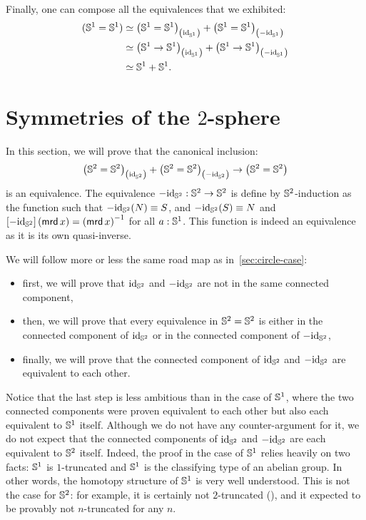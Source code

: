 \documentclass[english,a4]{article}
\renewcommand{\ap}[1]{\left[{#1}\right]}
\begin{document}
Finally, one can compose all the equivalences that we exhibited:
\begin{align*}
  ({{\mathbb S^{1}}}={{\mathbb S^{1}}})
  & \simeq {\left({{\mathbb S^{1}}}= {{\mathbb S^{1}}}\right)}_{\left(\mathord{\mathrm{id}}_{{\mathbb S^{1}}}\right)}
    + {\left({{\mathbb S^{1}}} = {{\mathbb S^{1}}}\right)}_{\left(-\mathord{\mathrm{id}}_{{\mathbb S^{1}}}\right)}
  \\
  & \simeq {\left({{\mathbb S^{1}}}\to {{\mathbb S^{1}}}\right)}_{\left(\mathord{\mathrm{id}}_{{\mathbb S^{1}}}\right)}
    + {\left({{\mathbb S^{1}}} \to {{\mathbb S^{1}}}\right)}_{\left(-\mathord{\mathrm{id}}_{{\mathbb S^{1}}}\right)}
  \\
  & \simeq {{\mathbb S^{1}}} + {{\mathbb S^{1}}}.
\end{align*}

\section{Symmetries of the $2$-sphere}
\label{sec:sphere}

In this section, we will prove that the canonical inclusion:
\begin{equation}
  \label{eq:goal-section-sphere}
  {\left({{\mathbb S^{2}}}= {{\mathbb S^{2}}}\right)}_{\left(\mathord{\mathrm{id}}_{{\mathbb S^{2}}}\right)} +
  {\left({{\mathbb S^{2}}} = {{\mathbb S^{2}}}\right)}_{\left(-\mathord{\mathrm{id}}_{{\mathbb S^{2}}}\right)}
  \to 
  \left({{\mathbb S^{2}}} = {{\mathbb S^{2}}}\right)
\end{equation}
is an equivalence. The equivalence $-\mathord{\mathrm{id}}_{{\mathbb S^{2}}} : {{\mathbb S^{2}}} \to {{\mathbb S^{2}}}$ is
define by ${{\mathbb S^{2}}}$-induction as the function such that
$-\mathord{\mathrm{id}}_{{\mathbb S^{2}}}(N) \equiv S$, and $-\mathord{\mathrm{id}}_{{\mathbb S^{2}}}(S) \equiv N$ and
$\ap{-\id_\Sp}(\mrd x) = \inv{(\mrd x)}$ for all $a:{{\mathbb S^{1}}}$. This
function is indeed an equivalence as it is its own quasi-inverse.

We will follow more or less the same road map as
in~\cref{sec:circle-case}:
\begin{itemize}
\item first, we will prove that $\mathord{\mathrm{id}}_{{\mathbb S^{2}}}$ and $-\mathord{\mathrm{id}}_{{\mathbb S^{2}}}$ are not in
  the same connected component,
\item then, we will prove that every equivalence in ${{\mathbb S^{2}}}={{\mathbb S^{2}}}$ is
  either in the connected component of $\mathord{\mathrm{id}}_{{\mathbb S^{2}}}$ or in the connected
  component of $-\mathord{\mathrm{id}}_{{\mathbb S^{2}}}$,
\item finally, we will prove that the connected component of $\mathord{\mathrm{id}}_{{\mathbb S^{2}}}$
  and $-\mathord{\mathrm{id}}_{{\mathbb S^{2}}}$ are equivalent to each other.
\end{itemize}
Notice that the last step is less ambitious than in the case of ${{\mathbb S^{1}}}$,
where the two connected components were proven equivalent to each
other but also each equivalent to ${{\mathbb S^{1}}}$ itself. Although we do not
have any counter-argument for it, we do not expect that the connected
components of $\mathord{\mathrm{id}}_{{\mathbb S^{2}}}$ and $-\mathord{\mathrm{id}}_{{\mathbb S^{2}}}$ are each equivalent to ${{\mathbb S^{2}}}$
itself. Indeed, the proof in the case of ${{\mathbb S^{1}}}$ relies heavily on two
facts: ${{\mathbb S^{1}}}$ is $1$-truncated and ${{\mathbb S^{1}}}$ is the classifying type of an
abelian group. In other words, the homotopy structure of ${{\mathbb S^{1}}}$ is very
well understood. This is not the case for ${{\mathbb S^{2}}}$: for example, it is
certainly not $2$-truncated (\cite{brunerie:thesis}), and it expected
to be provably not $n$-truncated for any $n$.
\end{document}
